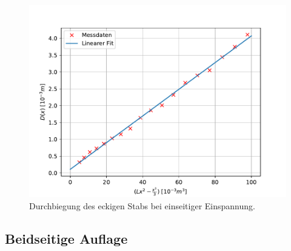 \begin{figure}[!htb]
  \centering
  \includegraphics[scale=0.75]{content/plots/ecke.pdf}
  \caption{Durchbiegung des eckigen Stabs bei einseitiger Einspannung.}
  \label{fig:LinRegecke}
\end{figure}



\subsection{Beidseitige Auflage}
\label{subsec:beidAuf}

